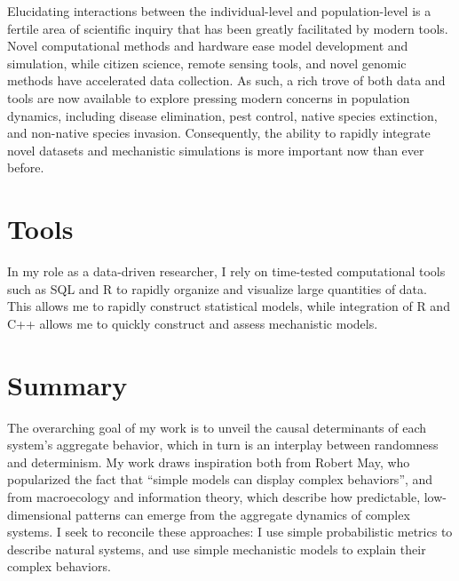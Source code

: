 \documentclass[12pt]{article}
\begin{document}
Elucidating interactions between the individual-level and 
population-level is a fertile area of scientific 
inquiry that has been greatly facilitated by modern tools.
Novel computational methods and hardware ease model 
development and simulation, while citizen science, remote
sensing tools, and novel genomic methods have accelerated
data collection. As such, a rich trove of both data and 
tools are now available to explore pressing modern concerns
in population dynamics, including disease elimination, 
pest control, native species extinction, 
and non-native species 
invasion.  Consequently, the ability to rapidly 
integrate novel datasets and mechanistic simulations 
is more important now than ever before.

\section*{Tools}
In my role as a data-driven researcher, I rely on time-tested
computational tools such as SQL and R to rapidly organize and visualize
large quantities of data.  This allows me to rapidly construct statistical
models, while integration of R and C++ allows me to quickly construct and 
assess mechanistic models.  

\section*{Summary}
The overarching goal of my work is to unveil the causal 
determinants of each system's aggregate behavior, which in
turn is an interplay between randomness and determinism.
My work draws inspiration both from Robert May, who popularized  
the fact that ``simple models can display complex behaviors'', 
and from macroecology and information theory, which describe how 
predictable, low-dimensional patterns can emerge from the 
aggregate dynamics of complex systems.  I seek to reconcile
these approaches: I use simple probabilistic metrics to 
describe natural systems, and use simple mechanistic 
models to explain their complex behaviors.



\section{}

%
%
\end{document}
